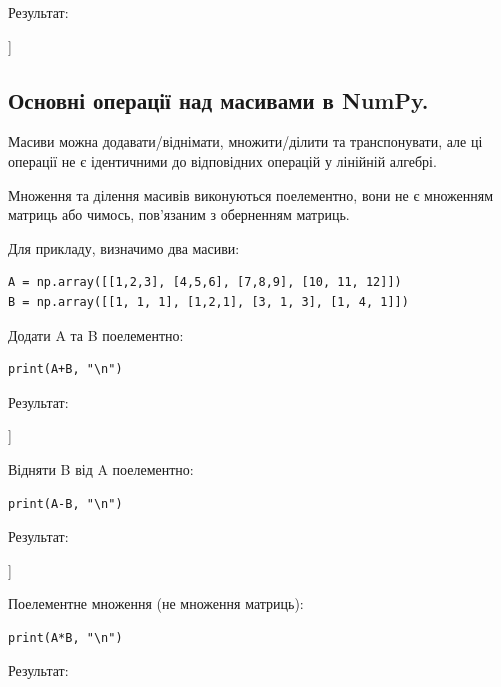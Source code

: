Результат:

\begin{console}
[[ 4  5  6]
 [10 11 12]] 
\end{console}



\subsection{Основні операції над масивами в NumPy.}

Масиви можна додавати/віднімати, множити/ділити та транспонувати, але ці операції не є ідентичними до відповідних операцій у лінійній алгебрі.

Множення та ділення масивів виконуються поелементно, вони не є множенням матриць або чимось, пов'язаним з оберненням матриць.

Для прикладу, визначимо два масиви:

\begin{lstlisting}
A = np.array([[1,2,3], [4,5,6], [7,8,9], [10, 11, 12]])
B = np.array([[1, 1, 1], [1,2,1], [3, 1, 3], [1, 4, 1]])
\end{lstlisting}

Додати A та B поелементно:

\begin{lstlisting}
print(A+B, "\n")
\end{lstlisting}

Результат:

\begin{console}
[[ 2  3  4]
 [ 5  7  7]
 [10  9 12]
 [11 15 13]] 
\end{console}



Відняти B від A поелементно:

\begin{lstlisting}
print(A-B, "\n")
\end{lstlisting}

Результат:

\begin{console}
[[ 0  1  2]
 [ 3  3  5]
 [ 4  7  6]
 [ 9  7 11]] 
\end{console}



Поелементне множення (не множення матриць):

\begin{lstlisting}
print(A*B, "\n")
\end{lstlisting}

Результат:

